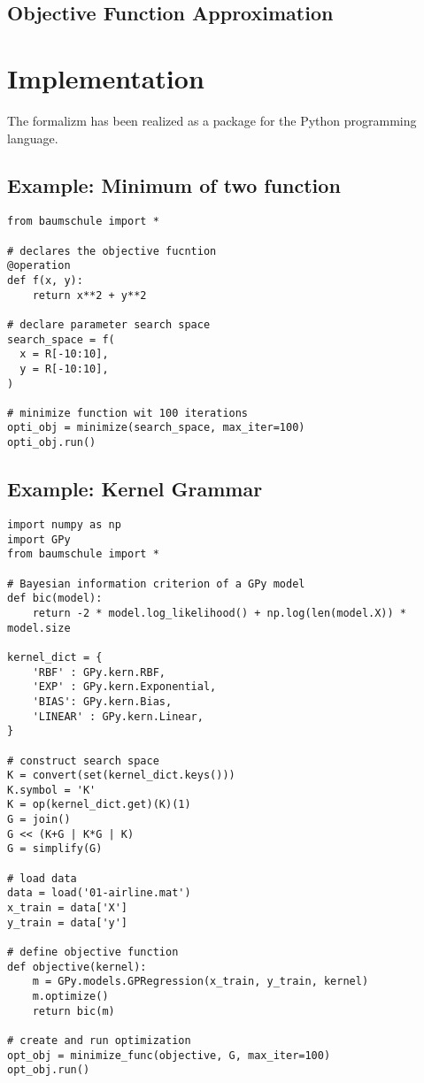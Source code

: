 \documentclass[english]{article}
\begin{document}
\subsection{Objective Function Approximation}


\section{Implementation}
The formalizm has been realized as a package for the Python programming language.

\subsection{Example: Minimum of two function}

\begin{verbatim}
from baumschule import *

# declares the objective fucntion
@operation
def f(x, y):
    return x**2 + y**2

# declare parameter search space
search_space = f(
  x = R[-10:10],
  y = R[-10:10],
)

# minimize function wit 100 iterations
opti_obj = minimize(search_space, max_iter=100)
opti_obj.run()

\end{verbatim}

\subsection{Example: Kernel Grammar}

\begin{verbatim}
import numpy as np
import GPy
from baumschule import *

# Bayesian information criterion of a GPy model
def bic(model):
    return -2 * model.log_likelihood() + np.log(len(model.X)) * model.size

kernel_dict = {
    'RBF' : GPy.kern.RBF,
    'EXP' : GPy.kern.Exponential,
    'BIAS': GPy.kern.Bias,
    'LINEAR' : GPy.kern.Linear,
}

# construct search space
K = convert(set(kernel_dict.keys()))
K.symbol = 'K'
K = op(kernel_dict.get)(K)(1)
G = join()
G << (K+G | K*G | K)
G = simplify(G)

# load data
data = load('01-airline.mat')
x_train = data['X']
y_train = data['y']

# define objective function
def objective(kernel):
    m = GPy.models.GPRegression(x_train, y_train, kernel)
    m.optimize()
    return bic(m)

# create and run optimization
opt_obj = minimize_func(objective, G, max_iter=100)
opt_obj.run()

\end{verbatim}
\end{document}
